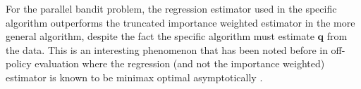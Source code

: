 For the parallel bandit problem, the regression estimator used in the specific algorithm outperforms the truncated importance weighted estimator in the more general algorithm, despite the fact the specific algorithm must estimate $\boldsymbol{q}$ from the data. 
This is an interesting phenomenon that has been noted before in off-policy evaluation where the regression (and not the importance weighted) estimator is known to be minimax optimal asymptotically \citep{LMS14}.

